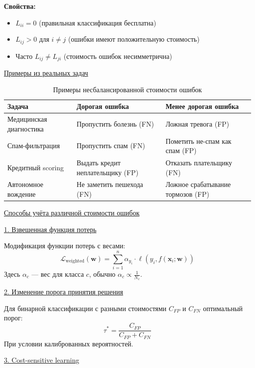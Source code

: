 \textbf{Свойства:}
\begin{itemize}
    \item $L_{ii} = 0$ (правильная классификация бесплатна)
    \item $L_{ij} > 0$ для $i \neq j$ (ошибки имеют положительную стоимость)
    \item Часто $L_{ij} \neq L_{ji}$ (стоимость ошибок несимметрична)
\end{itemize}

\underline{Примеры из реальных задач}

\begin{table}[h]
    \centering
    \begin{tabular}{|p{}|p{}|p{}|}
        \hline
        \textbf{Задача}         & \textbf{Дорогая ошибка}          & \textbf{Менее дорогая ошибка}     \\ \hline
        Медицинская диагностика & Пропустить болезнь (FN)          & Ложная тревога (FP)               \\ \hline
        Спам-фильтрация         & Пропустить спам (FN)             & Пометить не-спам как спам (FP)    \\ \hline
        Кредитный scoring       & Выдать кредит неплательщику (FP) & Отказать плательщику (FN)         \\ \hline
        Автономное вождение     & Не заметить пешехода (FN)        & Ложное срабатывание тормозов (FP) \\ \hline
    \end{tabular}
    \caption{Примеры несбалансированной стоимости ошибок}
    \label{tab:examples}
\end{table}

\underline{Способы учёта различной стоимости ошибок}

\underline{1. Взвешенная функция потерь}

Модификация функции потерь с весами:
\[ \mathcal{L}_{\text{weighted}}(\bm{w}) = \sum_{i=1}^n \alpha_{y_i} \cdot \ell(y_i, f(\bm{x}_i; \bm{w})) \]
Здесь $\alpha_c$ --- вес для класса $c$, обычно $\alpha_c \propto \frac{1}{N_c}$.

\underline{2. Изменение порога принятия решения}

Для бинарной классификации с разными стоимостями $C_{FP}$ и $C_{FN}$ оптимальный порог:
\[ \tau^* = \frac{C_{FP}}{C_{FP} + C_{FN}} \]
При условии калиброванных вероятностей.

\underline{3. Cost-sensitive learning}

